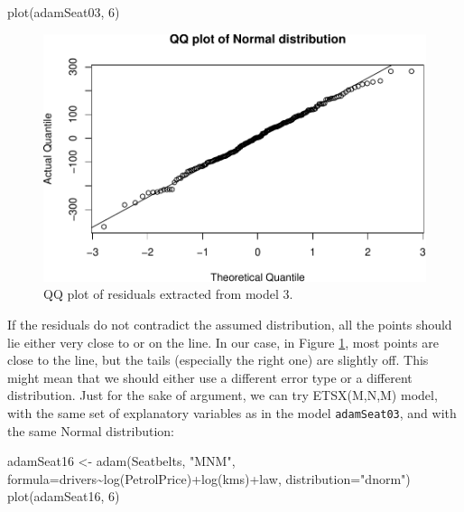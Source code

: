 \documentclass[
]{book}
\newenvironment{Shaded}{\begin{snugshade}}{\end{snugshade}}
\newcommand{\AttributeTok}[1]{\textcolor[rgb]{0.77,0.63,0.00}{#1}}
\newcommand{\DecValTok}[1]{\textcolor[rgb]{0.00,0.00,0.81}{#1}}
\newcommand{\FunctionTok}[1]{\textcolor[rgb]{0.00,0.00,0.00}{#1}}
\newcommand{\NormalTok}[1]{#1}
\newcommand{\OtherTok}[1]{\textcolor[rgb]{0.56,0.35,0.01}{#1}}
\newcommand{\SpecialCharTok}[1]{\textcolor[rgb]{0.00,0.00,0.00}{#1}}
\newcommand{\StringTok}[1]{\textcolor[rgb]{0.31,0.60,0.02}{#1}}
\theoremstyle{definition}
\theoremstyle{definition}
\theoremstyle{definition}
\theoremstyle{definition}
\theoremstyle{remark}
\begin{document}
\begin{Shaded}
\begin{Highlighting}[]
\FunctionTok{plot}\NormalTok{(adamSeat03, }\DecValTok{6}\NormalTok{)}
\end{Highlighting}
\end{Shaded}

\begin{figure}
\centering
\includegraphics{Svetunkov--2022----ADAM_files/figure-latex/adamSeat03QQ-1.pdf}
\caption{\label{fig:adamSeat03QQ}QQ plot of residuals extracted from model 3.}
\end{figure}

If the residuals do not contradict the assumed distribution, all the points should lie either very close to or on the line. In our case, in Figure \ref{fig:adamSeat03QQ}, most points are close to the line, but the tails (especially the right one) are slightly off. This might mean that we should either use a different error type or a different distribution. Just for the sake of argument, we can try ETSX(M,N,M) model, with the same set of explanatory variables as in the model \texttt{adamSeat03}, and with the same Normal distribution:

\begin{Shaded}
\begin{Highlighting}[]
\NormalTok{adamSeat16 }\OtherTok{\textless{}{-}} \FunctionTok{adam}\NormalTok{(Seatbelts, }\StringTok{"MNM"}\NormalTok{,}
                   \AttributeTok{formula=}\NormalTok{drivers}\SpecialCharTok{\textasciitilde{}}\FunctionTok{log}\NormalTok{(PetrolPrice)}\SpecialCharTok{+}\FunctionTok{log}\NormalTok{(kms)}\SpecialCharTok{+}\NormalTok{law,}
                   \AttributeTok{distribution=}\StringTok{"dnorm"}\NormalTok{)}
\FunctionTok{plot}\NormalTok{(adamSeat16, }\DecValTok{6}\NormalTok{)}
\end{Highlighting}
\end{Shaded}
\end{document}
